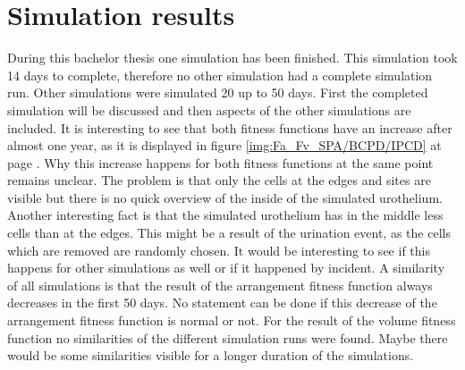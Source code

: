 \section{Simulation results}\label{sec:SimulationResults}
During this bachelor thesis one simulation has been finished. This simulation took 14 days to complete, therefore no other simulation had a complete simulation run. Other simulations were simulated 20 up to 50 days. First the completed simulation will be discussed and then aspects of the other simulations are included. \newline
It is interesting to see that both fitness functions have an increase after almost one year, as it is displayed in figure \ref{img:Fa_Fv_SPA/BCPD/IPCD} at page \pageref{img:Fa_Fv_SPA/BCPD/IPCD}. Why this increase happens for both fitness functions at the same point remains unclear. The problem is that only the cells at the edges and sites are visible but there is no quick overview of the inside of the simulated urothelium. Another interesting fact is that the simulated urothelium has in the middle less cells than at the edges. This might be a result of the urination event, as the cells which are removed are randomly chosen. It would be interesting to see if this happens for other simulations as well or if it happened by incident. \newline
A similarity of all simulations is that the result of the arrangement fitness function always decreases in the first 50 days. No statement can be done if this decrease of the arrangement fitness function is normal or not. For the result of the volume fitness function no similarities of the different simulation runs were found. Maybe there would be some similarities visible for a longer duration of the simulations.



